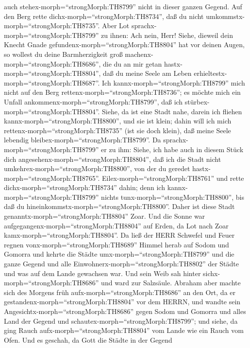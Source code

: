 auch stehex-morph=``strongMorph:TH8799'' nicht in dieser ganzen Gegend.
Auf den Berg rette dichx-morph=``strongMorph:TH8734'', daß du nicht
umkommstx-morph=``strongMorph:TH8735''.  Aber Lot
sprachx-morph=``strongMorph:TH8799'' zu ihnen: Ach nein, Herr!
 Siehe, dieweil dein Knecht Gnade
gefundenx-morph=``strongMorph:TH8804'' hat vor deinen Augen, so wollest
du deine Barmherzigkeit groß machenx-morph=``strongMorph:TH8686'', die
du an mir getan hastx-morph=``strongMorph:TH8804'', daß du meine Seele
am Leben erhieltestx-morph=``strongMorph:TH8687''. Ich
kannx-morph=``strongMorph:TH8799'' mich nicht auf den Berg
rettenx-morph=``strongMorph:TH8736''; es möchte mich ein Unfall
ankommenx-morph=``strongMorph:TH8799'', daß ich
stürbex-morph=``strongMorph:TH8804''.  Siehe, da ist eine
Stadt nahe, darein ich fliehen kannx-morph=``strongMorph:TH8800'', und
sie ist klein; dahin will ich mich rettenx-morph=``strongMorph:TH8735''
(ist sie doch klein), daß meine Seele lebendig
bleibex-morph=``strongMorph:TH8799''.  Da
sprachx-morph=``strongMorph:TH8799'' er zu ihm: Siehe, ich habe auch in
diesem Stück dich angesehenx-morph=``strongMorph:TH8804'', daß ich die
Stadt nicht umkehrex-morph=``strongMorph:TH8800'', von der du geredet
hastx-morph=``strongMorph:TH8765''. 
Eilex-morph=``strongMorph:TH8761'' und rette
dichx-morph=``strongMorph:TH8734'' dahin; denn ich
kannx-morph=``strongMorph:TH8799'' nichts
tunx-morph=``strongMorph:TH8800'', bis daß du
hineinkommstx-morph=``strongMorph:TH8800''. Daher ist diese Stadt
genanntx-morph=``strongMorph:TH8804'' Zoar.  Und die Sonne
war aufgegangenx-morph=``strongMorph:TH8804'' auf Erden, da Lot nach
Zoar kamx-morph=``strongMorph:TH8804''.  Da ließ der HERR
Schwefel und Feuer regnen vonx-morph=``strongMorph:TH8689'' Himmel herab
auf Sodom und Gomorra  und kehrte die Städte
umx-morph=``strongMorph:TH8799'' und die ganze Gegend und alle
Einwohnerx-morph=``strongMorph:TH8802'' der Städte und was auf dem Lande
gewachsen war.  Und sein Weib sah hinter
sichx-morph=``strongMorph:TH8686'' und ward zur Salzsäule. 
Abraham aber machte sich des Morgens früh
aufx-morph=``strongMorph:TH8686'' an den Ort, da er
gestandenx-morph=``strongMorph:TH8804'' vor dem HERRN,  und
wandte sein Angesichtx-morph=``strongMorph:TH8686'' gegen Sodom und
Gomorra und alles Land der Gegend und
schautex-morph=``strongMorph:TH8799''; und siehe, da ging Rauch
aufx-morph=``strongMorph:TH8804'' vom Lande wie ein Rauch vom Ofen.
 Und es geschah, da Gott die Städte in der Gegend
